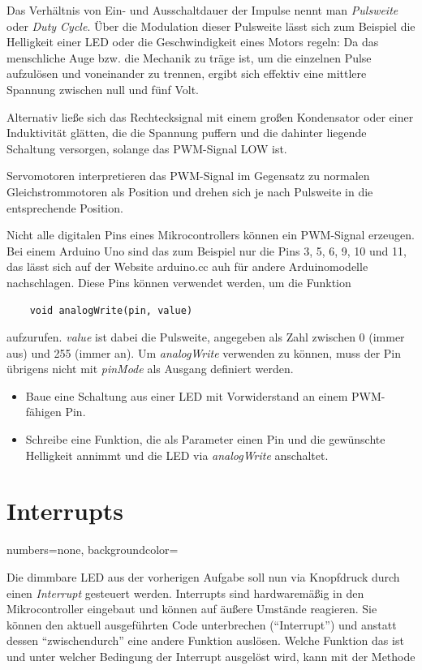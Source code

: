 \documentclass[10pt,a4paper]{article}
\begin{document}
Das Verhältnis von Ein- und Ausschaltdauer der Impulse nennt man \emph{Pulsweite} oder \emph{Duty Cycle}. Über die Modulation dieser Pulsweite lässt sich zum Beispiel die Helligkeit einer LED oder die Geschwindigkeit eines Motors regeln: Da das menschliche Auge bzw. die Mechanik zu träge ist, um die einzelnen Pulse aufzulösen und voneinander zu trennen, ergibt sich effektiv eine mittlere Spannung zwischen null und fünf Volt.

Alternativ ließe sich das Rechtecksignal mit einem großen Kondensator oder einer Induktivität glätten, die die Spannung puffern und die dahinter liegende Schaltung versorgen, solange das PWM-Signal LOW ist.

\bigskip
Servomotoren interpretieren das PWM-Signal im Gegensatz zu normalen Gleichstrommotoren als Position und drehen sich je nach Pulsweite in die entsprechende Position.

Nicht alle digitalen Pins eines Mikrocontrollers können ein PWM-Signal erzeugen. Bei einem Arduino Uno sind das zum Beispiel nur die Pins 3, 5, 6, 9, 10 und 11, das lässt sich auf der Website arduino.cc auh für andere Arduinomodelle nachschlagen. Diese Pins können verwendet werden, um die Funktion

\begin{lstlisting}
	void analogWrite(pin, value)
\end{lstlisting}

aufzurufen. \textit{value} ist dabei die Pulsweite, angegeben als Zahl zwischen 0 (immer aus) und 255 (immer an). Um \textit{analogWrite} verwenden zu können, muss der Pin übrigens nicht mit \textit{pinMode} als Ausgang definiert werden.


\begin{itemize}
	\item Baue eine Schaltung aus einer LED mit Vorwiderstand an einem PWM-fähigen Pin.
	\item Schreibe eine Funktion, die als Parameter einen Pin und die gewünschte Helligkeit annimmt und die LED via \textit{analogWrite} anschaltet.
\end{itemize}


\section{Interrupts}
\lstset
{
	numbers=none,
	backgroundcolor=\color[gray]{0.85}
}

Die dimmbare LED aus der vorherigen Aufgabe soll nun via Knopfdruck durch einen \emph{Interrupt} gesteuert werden. Interrupts sind hardwaremäßig in den Mikrocontroller eingebaut und können auf äußere Umstände reagieren. Sie können den aktuell ausgeführten Code unterbrechen ("`Interrupt"') und anstatt dessen "`zwischendurch"' eine andere Funktion auslösen. Welche Funktion das ist und unter welcher Bedingung der Interrupt ausgelöst wird, kann mit der Methode
\end{document}
